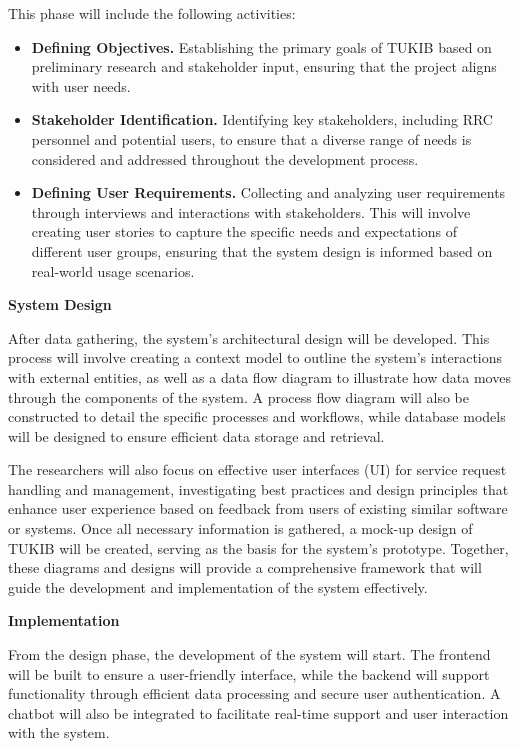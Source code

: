 This phase will include the following activities:

\begin{itemize}
	\item \textbf{Defining Objectives.} Establishing the primary goals of TUKIB based on preliminary research and stakeholder input, ensuring that the project aligns with user needs.
	\item \textbf{Stakeholder Identification.} Identifying key stakeholders, including RRC personnel and potential users, to ensure that a diverse range of needs is considered and addressed throughout the development process.
	\item \textbf{Defining User Requirements.} Collecting and analyzing user requirements through interviews and interactions with stakeholders. This will involve creating user stories to capture the specific needs and expectations of different user groups, ensuring that the system design is informed based on real-world usage scenarios.
\end{itemize}
	
\noindent\textbf{System Design}
	
\noindent After data gathering, the system's architectural design will be developed. This process will involve creating a context model to outline the system's interactions with external entities, as well as a data flow diagram to illustrate how data moves through the components of the system. A process flow diagram will also be constructed to detail the specific processes and workflows, while database models will be designed to ensure efficient data storage and retrieval. 

The researchers will also focus on effective user interfaces (UI) for service request handling and management, investigating best practices and design principles that enhance user experience based on feedback from users of existing similar software or systems. Once all necessary information is gathered, a mock-up design of TUKIB will be created, serving as the basis for the system's prototype. Together, these diagrams and designs will provide a comprehensive framework that will guide the development and implementation of the system effectively.\newline
	
\noindent\textbf{Implementation}
	
\noindent From the design phase, the development of the system will start. The frontend will be built to ensure a user-friendly interface, while the backend will support functionality through efficient data processing and secure user authentication. A chatbot will also be integrated to facilitate real-time support and user interaction with the system.

